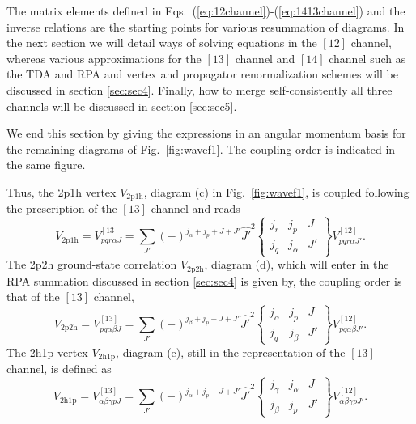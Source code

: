The matrix elements defined in Eqs.\ 
(\ref{eq:12channel})-(\ref{eq:1413channel}) and the inverse relations 
are the 
starting points for various resummation of diagrams.
In the next section we will detail ways of solving equations
in the $[12]$ channel, whereas various approximations for the 
$[13]$ channel and $[14]$ channel such as the TDA and RPA 
and  vertex and propagator renormalization schemes 
will be discussed in section \ref{sec:sec4}. Finally, how to
merge self-consistently  all three channels will be discussed
in section \ref{sec:sec5}.

We end this section by giving the expressions in an angular momentum
basis for the remaining 
diagrams of Fig.\ \ref{fig:wavef1}. The coupling order is indicated
in the same figure. 

Thus, the 2p1h vertex $V_{\mathrm{2p1h}}$, 
diagram (c) in  Fig.\  \ref{fig:wavef1}, 
is coupled
following the prescription of the $[13]$ channel and reads
\begin{equation}
      V_{\mathrm{2p1h}}=V_{pqr\alpha J}^{[13]}=
      {\displaystyle \sum_{J'}}(-)^{j_{\alpha}+j_p+J+J'}\hat{J'}^2
      \left\{
      \begin{array}{ccc}
       j_r&j_p&J\\j_q&j_{\alpha}&J'
      \end{array}
       \right\}
       V_{pqr\alpha J'}^{[12]}.
       \label{eq:2p1hv}
\end{equation}
The 2p2h ground-state correlation $V_{\mathrm{2p2h}}$, diagram (d),
 which will enter
in the RPA summation discussed in section \ref{sec:sec4} is given by,
the coupling order is that of the $[13]$ channel, 
\begin{equation}
      V_{\mathrm{2p2h}}=V_{pq\alpha\beta J}^{[13]}=
      {\displaystyle \sum_{J'}}(-)^{j_{\beta}+j_p+J+J'}\hat{J'}^2
      \left\{
      \begin{array}{ccc}
       j_{\alpha}&j_p&J\\j_q&j_{\beta}&J'
      \end{array}
       \right\}
       V_{pq\alpha\beta J'}^{[12]}.
       \label{eq:2p2hv}
\end{equation}
The 2h1p vertex $V_{\mathrm{2h1p}}$, diagram (e), 
still in the representation of 
the $[13]$ channel, is defined as
\begin{equation}
      V_{\mathrm{2h1p}}=V_{\alpha\beta\gamma p J}^{[13]}=
      {\displaystyle \sum_{J'}}(-)^{j_{\alpha}+j_p+J+J'}\hat{J'}^2
      \left\{
      \begin{array}{ccc}
       j_{\gamma}&j_{\alpha}&J\\j_{\beta}&j_p&J'
      \end{array}
       \right\}
       V_{\alpha\beta\gamma p J'}^{[12]}.
       \label{eq:2h1pv}
\end{equation}
